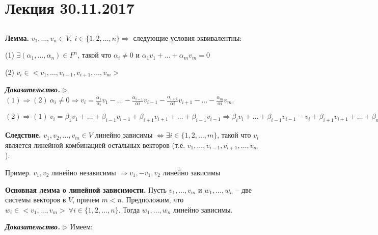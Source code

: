 \section{Лекция 30.11.2017}

\subsection{}

\vspace{\baselineskip}
\textbf{Лемма.} $v_1, \dots, v_n \in V, \ i \in \{1, 2, \dots, n\} \Rightarrow$ следующие условия эквивалентны:

(1) $\exists (\alpha_1, \dots, \alpha_n) \in F^n$, такой что $\alpha_i \neq 0$ и $\alpha_1 v_1 + \dots + \alpha_m v_m = 0$

(2) $v_i \in <v_1, \dots, v_{i-1}, v_{i + 1}, \dots , v_m>$

\vspace{\baselineskip}
\textbf{\textit{Доказательство.}} $\rhd$ $(1) \Rightarrow (2) \ \alpha_i \neq 0 \Rightarrow v_i = \frac{\alpha_1}{\alpha_i} v_1 - \dots - \frac{\alpha_{i-1}}{\alpha{i}} v_{i - 1} - \frac{\alpha_{i+1}}{\alpha{i}} v_{i + 1} - \dots - \frac{\alpha_{m}}{\alpha{i}} v_m$.

$(2) \Rightarrow (1) \ v_i = \beta_1 v_1 + \dots + \beta_{i - 1} v_{i - 1} + \beta_{i + 1} v_{i + 1} + \dots + \beta_{i - 1} v_{i - 1} \Rightarrow \beta_i v_i + \dots + \beta_{i-1} v_{i-1} - v_i + \beta_{i+1} v_{i+1} + \dots + \beta_{m} v_{m} = 0 \ \lhd$

\vspace{\baselineskip}
\textbf{Следствие.} $v_1, v_2, \dots, v_m \in V$ линейно зависимы $\Leftrightarrow \exists i \in \{1, 2, \dots, m\}$, такой что $v_i$ является линейной комбинацией остальных векторов (т.е. $v_1, \dots, v_{i-1}, v_{i+1}, \dots, v_m$).

\vspace{\baselineskip}
Пример. $v_1, v_2$ линейно независимы $\Rightarrow v_1, -v_1, v_2$ линейно зависимы

\vspace{\baselineskip}
\textbf{Основная лемма о линейной зависимости.} Пусть $v_1, \dots, v_m$ и $w_1, \dots, w_n$ -- две системы векторов в $V$, причем $m < n$. Предположим, что $w_i \in <v_1, \dots, v_m> \ \forall i \in \{1, 2, \dots, n\}$. Тогда $w_1, \dots, w_n$ линейно зависимы.

\vspace{\baselineskip}
\textbf{\textit{Доказательство.}} $\rhd$ Имеем:


